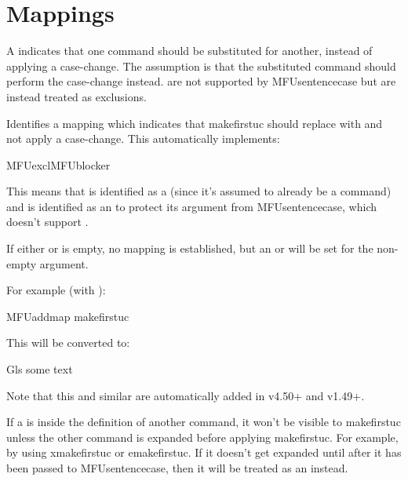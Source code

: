 \documentclass[titlepage=false,oneside,
 fontsize=12pt,captions=tableheading]{scrbook}
\begin{document}
\section{Mappings}
\label{sec:mappings}

A  indicates that one command should be substituted for
another, instead of applying a case-change. The assumption is that
the substituted command should perform the case-change instead.
 are not supported by \gls{MFUsentencecase} 
but are instead treated as exclusions.

Identifies a mapping which indicates that \gls{makefirstuc} should
replace  with  and not apply a case-change.
This automatically implements:
\begin{compactcodebox}
\gls{MFUexcl}\gls{MFUblocker}
\end{compactcodebox}
This means that  is identified as a  (since
it's assumed to already be a  command) and
 is identified as an  to protect its
argument from \gls{MFUsentencecase}, which doesn't support
.

\begin{information}
If either  or  is empty, no mapping is established, but an
 or  will be set for the non-empty argument.
\end{information}

For example (with ):
\begin{codebox}
\gls{MFUaddmap}
\gls{makefirstuc}
\end{codebox}
This will be converted to:
\begin{compactcodebox}
\gls{Gls} some text
\end{compactcodebox}
Note that this and similar  are automatically added
in  v4.50+ and  v1.49+.

\begin{important}
If a  is inside the definition of
another command, it won't be visible to \gls{makefirstuc} unless
the other command is expanded before applying \gls{makefirstuc}.
For example, by using \gls{xmakefirstuc} or \gls{emakefirstuc}.
If it doesn't get expanded until after it has been passed to
\gls{MFUsentencecase}, then it will be treated as an 
instead.
\end{important}
\end{document}
